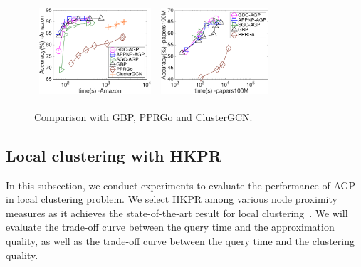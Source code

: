 \begin{figure}[t]
	\begin{small}
		\centering
		\vspace{-2mm}
		\begin{tabular}{cccc}
			\hspace{-4mm}  \includegraphics[height=32mm]{./Figs/GNN-accuracy-time-Amazon.eps} &
			\includegraphics[height=32mm]{./Figs/GNN-accuracy-time-papers100M.eps}
		\end{tabular}
		\vspace{-5mm}
		\caption{Comparison with GBP, PPRGo and ClusterGCN.}
		\label{fig:GBP}
		\vspace{-5mm}
	\end{small}
\end{figure}



\vspace{-2mm}
\subsection{Local clustering with HKPR}\label{subsec:clustering}
In this subsection, we conduct experiments to evaluate the performance of AGP in local clustering problem. We select HKPR among various node proximity measures as it achieves the state-of-the-art result for local clustering~\cite{chung2018computing,kloster2014heat,yang2019TEA}. 
We will evaluate the trade-off curve between the query time and the approximation quality, as well as the trade-off curve between the query time and the clustering quality.




